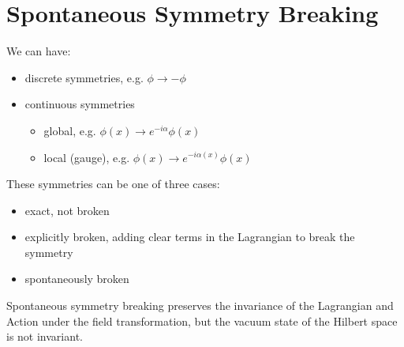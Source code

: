 \documentclass[relqm.tex]{subfiles}
\begin{document}
\section{Spontaneous Symmetry Breaking}
\begin{multicols}{2}
We can have:
\begin{itemize}
    \item discrete symmetries, e.g. $\phi\to-\phi$
    \item continuous symmetries
        \begin{itemize}
            \item global, e.g. $\phi(x)\to e^{-i\alpha}\phi(x)$
            \item local (gauge), e.g. $\phi(x)\to e^{-i\alpha(x)}\phi(x)$
        \end{itemize}
\end{itemize}
\columnbreak
These symmetries can be one of three cases:
\begin{itemize}
    \item exact, not broken
    \item explicitly broken, adding clear terms in the Lagrangian to break the symmetry
    \item spontaneously broken 
\end{itemize}
\end{multicols}
Spontaneous symmetry breaking preserves the invariance of the Lagrangian and Action under the field transformation, but the vacuum state of the Hilbert space is not invariant.
\end{document}
